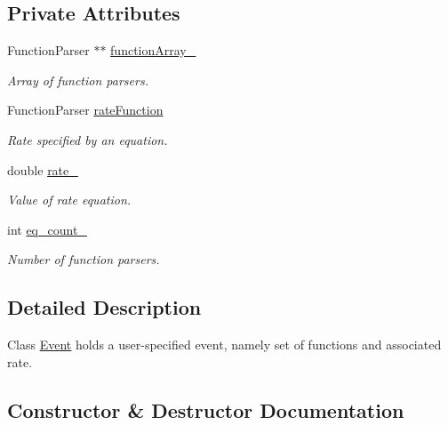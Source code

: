\subsection*{Private Attributes}
\begin{DoxyCompactItemize}
\item 
\mbox{\label{class_event_a77f230a68021756fd1e2d35dcfa534f8}} 
Function\+Parser $\ast$$\ast$ \hyperlink{class_event_a77f230a68021756fd1e2d35dcfa534f8}{function\+Array\+\_\+}
\begin{DoxyCompactList}\small\item\em Array of function parsers. \end{DoxyCompactList}\item 
\mbox{\label{class_event_a5a82a70465e39626ad62d1cfe3fc7617}} 
Function\+Parser \hyperlink{class_event_a5a82a70465e39626ad62d1cfe3fc7617}{rate\+Function}
\begin{DoxyCompactList}\small\item\em Rate specified by an equation. \end{DoxyCompactList}\item 
\mbox{\label{class_event_a42d51bef1ea3b953e9825f3e5bf2210e}} 
double \hyperlink{class_event_a42d51bef1ea3b953e9825f3e5bf2210e}{rate\+\_\+}
\begin{DoxyCompactList}\small\item\em Value of rate equation. \end{DoxyCompactList}\item 
\mbox{\label{class_event_a59244ccd0e0f3654f07715bb3dd6423f}} 
int \hyperlink{class_event_a59244ccd0e0f3654f07715bb3dd6423f}{eq\+\_\+count\+\_\+}
\begin{DoxyCompactList}\small\item\em Number of function parsers. \end{DoxyCompactList}\end{DoxyCompactItemize}


\subsection{Detailed Description}
Class \hyperlink{class_event}{Event} holds a user-\/specified event, namely set of functions and associated rate. 

\subsection{Constructor \& Destructor Documentation}
\mbox{\label{class_event_a5a40dd4708297f7031e29b39e039ae10}} 
